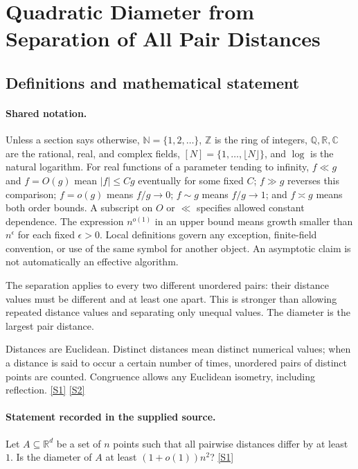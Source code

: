 \documentclass[11pt,a4paper]{article}
\newcommand{\N}{\mathbb{N}}
\newcommand{\Z}{\mathbb{Z}}
\newcommand{\Q}{\mathbb{Q}}
\newcommand{\R}{\mathbb{R}}
\newcommand{\C}{\mathbb{C}}
\newcommand{\sref}[2]{\hyperlink{source:#1:#2}{[S#2]}}
\begin{document}
\section{Quadratic Diameter from Separation of All Pair Distances}\label{statement}


\subsection{Definitions and mathematical statement}

\paragraph{Shared notation.}Unless a section says otherwise, $\N=\{1,2,\ldots\}$,
$\Z$ is the ring of integers, $\Q,\R,\C$ are the rational, real, and complex
fields, $[N]=\{1,\ldots,\lfloor N\rfloor\}$, and $\log$ is the natural
logarithm. For real functions of a parameter tending to infinity,
$f\ll g$ and $f=O(g)$ mean $|f|\leq Cg$ eventually for some fixed $C$;
$f\gg g$ reverses this comparison; $f=o(g)$ means $f/g\to0$;
$f\sim g$ means $f/g\to1$; and $f\asymp g$ means both order bounds.
A subscript on $O$ or $\ll$ specifies allowed constant dependence.
The expression $n^{o(1)}$ in an upper bound means growth smaller than
$n^\epsilon$ for each fixed $\epsilon>0$. Local definitions govern any
exception, finite-field convention, or use of the same symbol for another
object. An asymptotic claim is not automatically an effective algorithm.



The separation applies to every two different unordered pairs: their distance values must be different and at least one apart. This is stronger than allowing repeated distance values and separating only unequal values. The diameter is the largest pair distance.

Distances are Euclidean. Distinct distances mean distinct numerical values; when a distance is said to occur a certain number of times, unordered pairs of distinct points are counted. Congruence allows any Euclidean isometry, including reflection. \sref{statement}{1} \sref{statement}{2}

\paragraph{Statement recorded in the supplied source.}
Let $A\subseteq \mathbb{R}^d$ be a set of $n$ points such that all pairwise distances differ by at least $1$. Is the diameter of $A$ at least $(1+o(1))n^2$? \sref{statement}{1}
\end{document}
